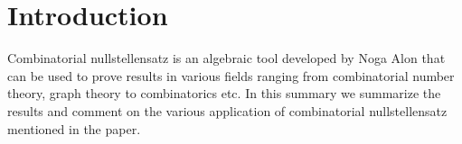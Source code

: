 \section{Introduction}
Combinatorial nullstellensatz is an algebraic tool developed by Noga Alon that can be used to prove results in various fields ranging from combinatorial number theory, graph theory to combinatorics etc. In this summary we summarize the results and comment on the various application of combinatorial nullstellensatz mentioned in the paper. 